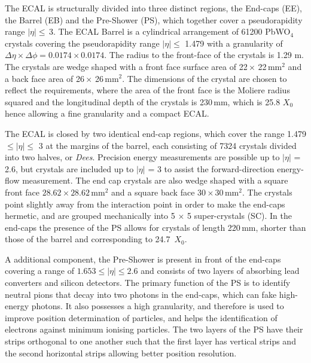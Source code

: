 The ECAL is structurally divided into three distinct regions, the End-caps (EE), the Barrel (EB) and the Pre-Shower (PS), which together cover a pseudorapidity range $|\eta| \leq$\,3. The ECAL Barrel is a cylindrical arrangement of 61200 PbWO$_{4}$ crystals covering the pseudorapidity range $|\eta| \leq$ 1.479 with a granularity of $\Delta \eta \times \Delta \phi = 0.0174 \times 0.0174$. The radius to the front-face of the crystals is 1.29 m. The crystals are wedge shaped with a front face surface area of 22\,$\times$ 22\,mm$^{2}$ and a back face area of 26\,$\times$ 26\,mm$^{2}$. The dimensions of the crystal are chosen to reflect the requirements, where the area of the front face is the Moliere radius squared and the longitudinal depth of the crystals is 230\,mm, which is 25.8 $X_{0}$ hence allowing a fine granularity and a compact ECAL. 


The ECAL is closed by two identical end-cap regions, which cover the range 1.479 $\leq |\eta| \leq$ 3 at the margins of the barrel, each consisting of 7324 crystals divided into two halves, or \textit{Dees}. Precision energy measurements are possible up to $|\eta|$ = 2.6, but crystals are included up to $|\eta|$ = 3 to assist the forward-direction energy-flow measurement. The end cap crystals are also wedge shaped with a square front face $28.62 \times 28.62$\,mm$^{2}$ and a square back face $30 \times 30$\,mm$^{2}$. The crystals point slightly away from the interaction point in order to make the end-caps hermetic, and are grouped mechanically into 5 $\times$ 5 super-crystals (SC). In the end-caps the presence of the PS allows for crystals of length 220\,mm, shorter than those of the barrel and corresponding to 24.7~$X_{0}$.

A additional component, the Pre-Shower is present in front of the end-caps covering a range of $1.653\leq |\eta|\leq2.6$ and consists of two layers of absorbing lead converters and silicon detectors. The primary function of the PS is to identify neutral pions that decay into two photons in the end-caps, which can fake high-energy photons. It also possesses a high granularity, and therefore is used to improve position determination of particles, and helps the identification of electrons against minimum ionising particles. The two layers of the PS have their strips orthogonal to one another such that the first layer has vertical strips and the second horizontal strips allowing better position resolution.


